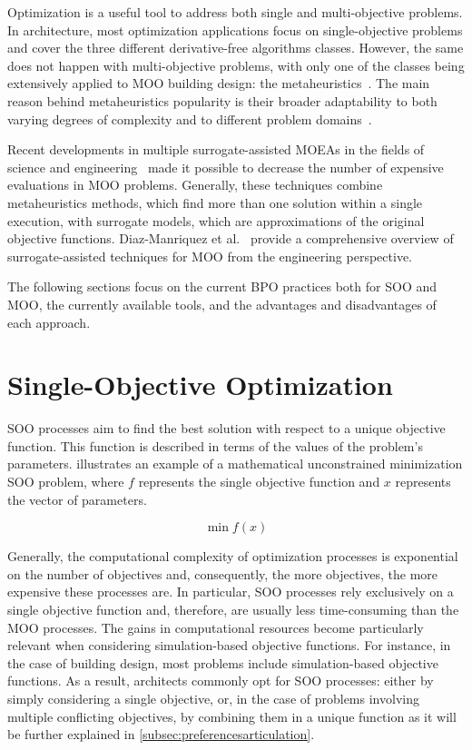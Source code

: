 Optimization is a useful tool to address both single and multi-objective problems. In architecture, most optimization applications focus on single-objective problems and cover the three different derivative-free algorithms classes. However, the same does not happen with multi-objective problems, with only one of the classes being extensively applied to \ac{MOO} building design: the metaheuristics~\cite{Hamdy2016}. The main reason behind metaheuristics popularity is their broader adaptability to both varying degrees of complexity and to different problem domains~\cite{BlumRoli2003Metaheuristics}.
	
Recent developments in multiple surrogate-assisted \acp{MOEA} in the fields of science and engineering~\cite{Zapotecas-Martinez2016,Hussein2016} made it possible to decrease the number of expensive evaluations in \ac{MOO} problems. Generally, these techniques combine metaheuristics methods, which find more than one solution within a single execution, with surrogate models, which are approximations of the original objective functions. Diaz-Manriquez et al.~\cite{Diaz-Manriquez2016} provide a comprehensive overview of surrogate-assisted techniques for \ac{MOO} from the engineering perspective. 

The following sections focus on the current \ac{BPO} practices both for \ac{SOO} and \ac{MOO}, the currently available tools, and the advantages and disadvantages of each approach.
	
\section{Single-Objective Optimization}
	
\ac{SOO} processes aim to find the best solution with respect to a unique objective function. This function is described in terms of the values of the problem's parameters.  illustrates an example of a mathematical unconstrained minimization \ac{SOO} problem, where $f$ represents the single objective function and $x$ represents the vector of parameters.
		
\begin{equation} \label{eq:soo}
   	\min f(x) 
\end{equation}

Generally, the computational complexity of optimization processes is exponential on the number of objectives and, consequently, the more objectives, the more expensive these processes are. In particular, \ac{SOO} processes rely exclusively on a single objective function and, therefore, are usually less time-consuming than the \ac{MOO} processes. The gains in computational resources become particularly relevant when considering simulation-based objective functions. For instance, in the case of building design, most problems include simulation-based objective functions. As a result, architects commonly opt for \ac{SOO} processes: either by simply considering a single objective, or, in the case of problems involving multiple conflicting objectives, by combining them in a unique function as it will be further explained in \cref{subsec:preferencesarticulation}.
	
